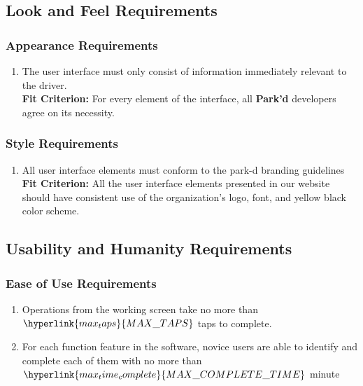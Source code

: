 \documentclass[12pt,letterpaper]{article}
\begin{document}
\subsection{Look and Feel Requirements}
\subsubsection{Appearance Requirements}
\begin{enumerate}[{LF}1.] 
    \item The user interface must only consist of information immediately
    relevant to the driver. \label{pocnf1} \\
    \textbf{Fit Criterion:} For every element of the interface, all
    \textbf{Park'd} developers agree on its necessity.
\end{enumerate}

\color{red}
\subsubsection{Style Requirements}
\begin{enumerate}[resume*]  
    \item All user interface elements must conform to the park-d branding
    guidelines\\
    \textbf{Fit Criterion:} All the user interface elements presented in our
    website should have consistent use of the organization's logo, font, and
    yellow black color scheme.
\end{enumerate}

\color{black}
\subsection{Usability and Humanity Requirements}
\subsubsection{Ease of Use Requirements}
\begin{enumerate}[{UH}1.] 
    \item Operations from the working screen take no more than
    $\hyperlink{max_taps}{MAX\_TAPS}$ taps to complete.\\
    \color{red}
    \item For each function feature in the software, novice users are able to
    identify and complete each of them with no more than
    $\hyperlink{max_time_complete}{MAX\_COMPLETE\_TIME}$ minute \\
\end{enumerate}
\color{black}
\end{document}
